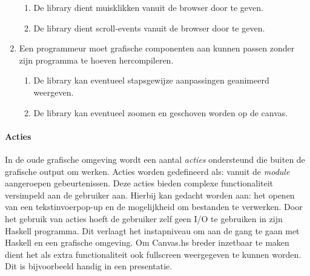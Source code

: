 \begin{enumerate}[label={R\arabic*}]
\begin{enumerate}[label={R\arabic{enumi}.\arabic*}]
		\item \label{req:event:mouse} De library dient muisklikken vanuit de browser door te geven.
		\item \label{req:event:scroll} De library dient scroll-events vanuit de browser door te geven.
	\end{enumerate}
	\item Een programmeur moet grafische componenten aan kunnen passen zonder zijn programma te hoeven hercompileren.
	\begin{enumerate}[label={R\arabic{enumi}.\arabic*}]
		\item \label{req:action:animate} De library kan eventueel stapsgewijze aanpassingen geanimeerd weergeven.
		\item \label{req:zoom} De library kan eventueel zoomen en geschoven worden op de canvas.
	\end{enumerate}
	\setcounter{startvalue}{\value{enumi}}
\end{enumerate}

\paragraph{Acties} In de oude grafische omgeving wordt een aantal \emph{acties} ondersteund die buiten de grafische output om werken. Acties worden gedefineerd als: vanuit de \emph{module} aangeroepen gebeurtenissen. Deze acties bieden complexe functionaliteit versimpeld aan de gebruiker aan. Hierbij kan gedacht worden aan: het openen van een tekstinvoerpop-up en de mogelijkheid om bestanden te verwerken. Door het gebruik van acties hoeft de gebruiker zelf geen I/O te gebruiken in zijn Haskell programma. Dit verlaagt het instapniveau om aan de gang te gaan met Haskell en een grafische omgeving. Om Canvas.hs breder inzetbaar te maken dient het als extra functionaliteit ook fullscreen weergegeven te kunnen worden. Dit is bijvoorbeeld handig in een presentatie.

